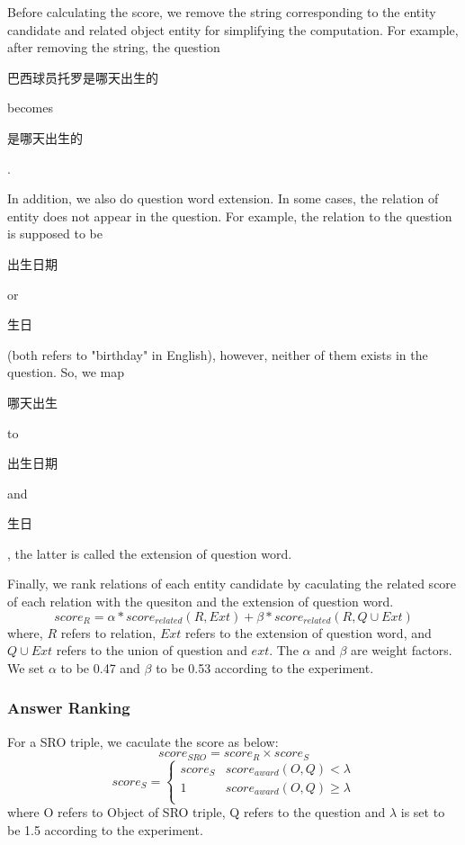 \documentclass{llncs}
\begin{document}
Before calculating the score, we remove the string corresponding to the entity 
candidate and related object entity for simplifying the computation. For 
example, after removing the string, the question \begin{CJK}{UTF8}{gbsn}
巴西球员托罗是哪天出生的
\end{CJK} becomes \begin{CJK}{UTF8}{gbsn}
是哪天出生的
\end{CJK}.

In addition, we also do question word extension. In some cases, the relation of 
entity does not appear in the question. For example, the relation to the question
is supposed to be \begin{CJK}{UTF8}{gbsn}
出生日期
\end{CJK} or \begin{CJK}{UTF8}{gbsn}
生日
\end{CJK} (both refers to "birthday" in English), however, neither of them 
exists in the question. So, we map \begin{CJK}{UTF8}{gbsn}
哪天出生
\end{CJK} to \begin{CJK}{UTF8}{gbsn}
出生日期
\end{CJK} and \begin{CJK}{UTF8}{gbsn}
生日
\end{CJK}, the latter is called the extension of question word. 

Finally, we rank relations of each entity candidate by caculating the related 
score of each relation with the quesiton and the extension of question word.
\begin{equation}
    score_{R} = \alpha * score_{related}(R, Ext) + 
                       \beta * score_{related}(R, Q \cup Ext)
  \end{equation}
where, $R$ refers to relation, $Ext$ refers to 
the extension of question word, and $Q \cup Ext$ refers to the union of question and $ext$. The $\alpha$ and $\beta$ are weight factors. We 
set $\alpha$ to be 0.47 and $\beta$ to be 0.53 according to the experiment.

\subsubsection{Answer Ranking}
For a SRO triple, we caculate the score as below:
\begin{equation}
    score_{SRO} = score_{R} \times score_{S}
  \end{equation}
\begin{equation}
    score_{S} = \begin{cases} 
                          score_{S} & score_{award}(O, Q) < \lambda \\
                          1 & score_{award}(O, Q) \geq \lambda \\
                          \end{cases}
  \end{equation}
where O refers to Object of SRO triple, Q refers to the question and $\lambda$ 
is set to be 1.5 according to the experiment. 
\end{document}
